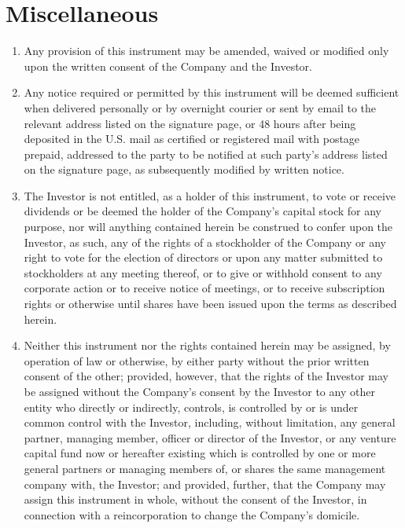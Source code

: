 \section{Miscellaneous}
\label{sec:miscellaneous}

\begin{enumerate}[label=(\alph*)]

\item {Any provision of this instrument may be amended, waived or modified only upon the written consent of the Company and the Investor. }

\item {\begin{sloppypar}Any notice required or permitted by this instrument will be
    deemed sufficient when delivered personally or by overnight
    courier or sent by email to the relevant address listed on the
    signature page, or 48 hours after being deposited in the U.S. mail
    as certified or registered mail with postage prepaid, addressed to
    the party to be notified at such party’s address listed on the
    signature page, as subsequently modified by written notice.\end{sloppypar}}

\item {The Investor is not entitled, as a holder of this instrument,
    to vote or receive dividends or be deemed the holder of the
    Company’s capital stock for any purpose, nor will anything
    contained herein be construed to confer upon the Investor, as
    such, any of the rights of a stockholder of the Company or any
    right to vote for the election of directors or upon any matter
    submitted to stockholders at any meeting thereof, or to give or
    withhold consent to any corporate action or to receive notice of
    meetings, or to receive subscription rights or otherwise until
    shares have been issued upon the terms as described herein.}

\item {\begin{sloppypar}Neither this instrument nor the rights contained herein may be
    assigned, by operation of law or otherwise, by either party
    without the prior written consent of the other; provided, however,
    that the rights of the Investor may be assigned without the
    Company’s consent by the Investor to any other entity who directly
    or indirectly, controls, is controlled by or is under common
    control with the Investor, including, without limitation, any
    general partner, managing member, officer or director of the
    Investor, or any venture capital fund now or hereafter existing
    which is controlled by one or more general partners or managing
    members of, or shares the same management company with, the
    Investor; and provided, further, that the Company may assign this
    instrument in whole, without the consent of the Investor, in
    connection with a reincorporation to change the Company’s
    domicile.\end{sloppypar}}


\end{enumerate}
